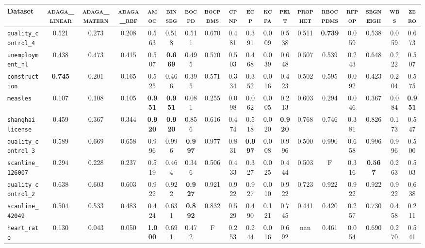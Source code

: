\begin{tabular}{lccccccccccccccccc}
Dataset & \textsc{adaga_linear} & \textsc{adaga_matern} & \textsc{adaga_rbf} & \textsc{amoc} & \textsc{binseg} & \textsc{bocpd} & \textsc{bocpdms} & \textsc{cpnp} & \textsc{ecp} & \textsc{kcpa} & \textsc{pelt} & \textsc{prophet} & \textsc{rbocpdms} & \textsc{rfpop} & \textsc{segneigh} & \textsc{wbs} & \textsc{zero}\\
\toprule
\verb+quality_control_4+ & 0.521 & 0.273 & 0.208 & 0.563 & 0.518 & 0.511 & 0.670 & 0.481 & 0.391 & 0.009 & 0.538 & 0.511 & \textbf{0.739} & 0.059 & 0.538 & 0.059 & 0.673\\
\verb+unemployment_nl+ & 0.438 & 0.473 & 0.415 & 0.507 & \textbf{0.669} & 0.495 & 0.570 & 0.503 & 0.468 & 0.039 & 0.648 & 0.507 & 0.539 & 0.243 & 0.648 & 0.222 & 0.507\\
\verb+construction+ & \textbf{0.745} & 0.201 & 0.165 & 0.525 & 0.466 & 0.395 & 0.571 & 0.334 & 0.352 & 0.016 & 0.423 & 0.502 & 0.595 & 0.092 & 0.423 & 0.204 & 0.575\\
\verb+measles+ & 0.107 & 0.108 & 0.105 & \textbf{0.951} & \textbf{0.951} & 0.081 & 0.255 & 0.098 & 0.062 & 0.005 & 0.213 & 0.603 & 0.294 & 0.046 & 0.367 & 0.084 & \textbf{0.951}\\
\verb+shanghai_license+ & 0.459 & 0.367 & 0.344 & \textbf{0.920} & \textbf{0.920} & 0.856 & 0.616 & 0.474 & 0.518 & 0.020 & \textbf{0.920} & 0.768 & 0.746 & 0.381 & 0.826 & 0.173 & 0.547\\
\verb+quality_control_3+ & 0.589 & 0.669 & 0.658 & 0.996 & 0.996 & \textbf{0.997} & 0.977 & 0.831 & \textbf{0.997} & 0.008 & 0.996 & 0.500 & 0.990 & 0.658 & 0.996 & 0.996 & 0.500\\
\verb+scanline_126007+ & 0.294 & 0.228 & 0.237 & 0.519 & 0.464 & 0.346 & 0.506 & 0.433 & 0.327 & 0.025 & 0.444 & 0.503 & F & 0.316 & \textbf{0.567} & 0.263 & 0.503\\
\midrule
\verb+quality_control_2+ & 0.638 & 0.603 & 0.603 & 0.922 & 0.922 & \textbf{0.927} & 0.921 & 0.922 & 0.927 & 0.010 & 0.922 & 0.723 & 0.922 & 0.922 & 0.922 & 0.922 & 0.638\\
\verb+scanline_42049+ & 0.504 & 0.533 & 0.483 & 0.424 & 0.631 & \textbf{0.892} & 0.832 & 0.529 & 0.490 & 0.121 & 0.745 & 0.441 & 0.420 & 0.257 & 0.730 & 0.458 & 0.211\\
\verb+heart_rate+ & 0.130 & 0.043 & 0.050 & \textbf{1.000} & 0.691 & 0.472 & F & 0.253 & 0.244 & 0.016 & 0.692 & nan & 0.461 & 0.054 & 0.690 & 0.270 & 0.541\\
\bottomrule
\end{tabular}
